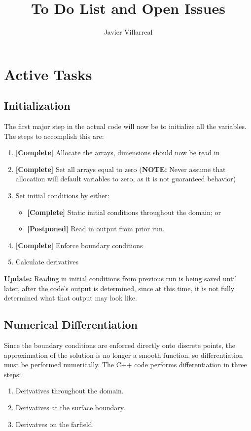 \documentclass[12pt]{article}
\begin{document}
    \title{To Do List and Open Issues}
    \author{Javier Villarreal}
    \date{}
    \maketitle

    \section{Active Tasks}

    \subsection{Initialization}
    The first major step in the actual code will now be to initialize all the variables. The steps to accomplish this are:
    \begin{enumerate}
        \item \textbf{[Complete]} Allocate the arrays, dimensions should now be read in
        \item \textbf{[Complete]} Set all arrays equal to zero (\textbf{NOTE:} Never assume that allocation will default variables to zero, as it is not guaranteed behavior)
        \item Set initial conditions by either:
        \begin{itemize}
            \item \textbf{[Complete]} Static initial conditions throughout the domain; or
            \item \textbf{[Postponed]} Read in output from prior run.
        \end{itemize}
        \item \textbf{[Complete]} Enforce boundary conditions
        \item Calculate derivatives
    \end{enumerate}
    
    \textbf{Update:} Reading in initial conditions from previous run is being saved until later, after the code's output is determined, since at this time, it is not fully determined what that output may look like.

    \subsection{Numerical Differentiation}
    Since the boundary conditions are enforced directly onto discrete points, the approximation of the solution is no longer a smooth function, so differentiation must be performed numerically. The C++ code performs differentiation in three steps:
    \begin{enumerate}
        \item Derivatives throughout the domain.
        \item Derivatives at the surface boundary.
        \item Derivatves on the farfield.
    \end{enumerate}
\end{document}
